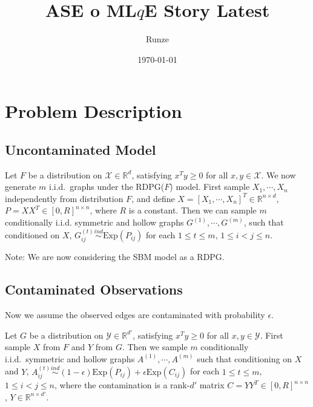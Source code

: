 \documentclass[a4paper]{article}
\title{ASE o ML$q$E Story Latest}
\author{Runze}
\date{\today}
\begin{document}
\maketitle

\section{Problem Description}

\subsection{Uncontaminated Model}
Let $F$ be a distribution on $\mathcal{X} \in \mathbb{R}^d$, satisfying $x^T y \ge 0$ for all $x, y \in \mathcal{X}$. We now generate $m$ i.i.d.~graphs under the RDPG($F$) model. First sample $X_1, \cdots, X_n$ independently from distribution $F$,  and define $X = [X_1, \cdots, X_n]^T \in \mathbb{R}^{n \times d}$, $P = X X^T \in [0, R]^{n \times n}$, where $R$ is a constant. Then we can sample $m$ conditionally i.i.d. symmetric and hollow graphs $G^{(1)}, \cdots, G^{(m)}$, such that conditioned on $X$, $G^{(t)}_{ij} \stackrel{ind}{\sim} \mathrm{Exp}(P_{ij})$ for each $1 \le t \le m$, $1 \le i < j \le n$.

Note: We are now considering the SBM model as a RDPG.

%




\subsection{Contaminated Observations}
Now we assume the observed edges are contaminated with probability $\epsilon$.

Let $G$ be a distribution on $\mathcal{Y} \in \mathbb{R}^{d'}$, satisfying $x^T y \ge 0$ for all $x, y \in \mathcal{Y}$. First sample $X$ from $F$ and $Y$ from $G$.
Then we sample $m$ conditionally i.i.d.~symmetric and hollow graphs $A^{(1)}, \cdots, A^{(m)}$ such that conditioning on $X$ and $Y$, $A^{(t)}_{ij} \stackrel{ind}{\sim} (1-\epsilon) \mathrm{Exp}(P_{ij}) + \epsilon \mathrm{Exp}(C_{ij})$ for each $1 \le t \le m$, $1 \le i < j \le n$,  where the contamination is a rank-$d'$ matrix $C = Y Y^T \in [0, R]^{n \times n}$, $Y \in \mathbb{R}^{n \times d'}$. 
\end{document}
